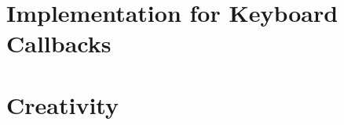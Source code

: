 \documentclass[11pt]{article}
\begin{document}
\section{Implementation for Keyboard Callbacks} \label{sec:5}

\section{Creativity} \label{sec:6}






\end{document}
